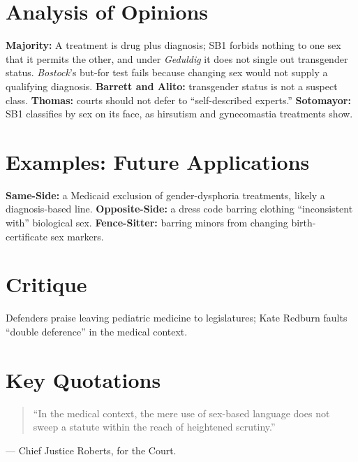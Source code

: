 \documentclass[12pt]{article}
\begin{document}
\section{Analysis of Opinions}
\textbf{Majority:} A treatment is drug plus diagnosis; SB1 forbids nothing to one sex that it permits the other, and under \textit{Geduldig} it does not single out transgender status. \textit{Bostock}'s but-for test fails because changing sex would not supply a qualifying diagnosis. \textbf{Barrett and Alito:} transgender status is not a suspect class. \textbf{Thomas:} courts should not defer to ``self-described experts.'' \textbf{Sotomayor:} SB1 classifies by sex on its face, as hirsutism and gynecomastia treatments show.

\section{Examples: Future Applications}
\textbf{Same-Side:} a Medicaid exclusion of gender-dysphoria treatments, likely a diagnosis-based line. \textbf{Opposite-Side:} a dress code barring clothing ``inconsistent with'' biological sex. \textbf{Fence-Sitter:} barring minors from changing birth-certificate sex markers.

\section{Critique}
Defenders praise leaving pediatric medicine to legislatures; Kate Redburn faults ``double deference'' in the medical context.

\section{Key Quotations}
\begin{quote}
``In the medical context, the mere use of sex-based language does not sweep a statute within the reach of heightened scrutiny.''
\end{quote}
\noindent --- Chief Justice Roberts, for the Court.
\end{document}
